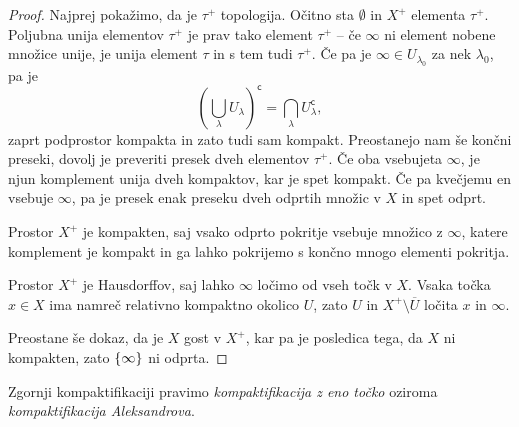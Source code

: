 \begin{proof}
Najprej pokažimo, da je $\tau^+$ topologija. Očitno sta $\emptyset$
in $X^+$ elementa $\tau^+$. Poljubna unija elementov $\tau^+$ je
prav tako element $\tau^+$ -- če $\infty$ ni element nobene množice
unije, je unija element $\tau$ in s tem tudi $\tau^+$. Če pa je
$\infty \in U_{\lambda_0}$ za nek $\lambda_0$, pa je
\[
\left(\bigcup_\lambda U_\lambda\right)^{\mathsf{c}} =
\bigcap_\lambda U_\lambda^{\mathsf{c}},
\]
zaprt podprostor kompakta in zato tudi sam kompakt. Preostanejo nam
še končni preseki, dovolj je preveriti presek dveh elementov
$\tau^+$. Če oba vsebujeta $\infty$, je njun komplement unija dveh
kompaktov, kar je spet kompakt. Če pa kvečjemu en vsebuje $\infty$, 
pa je presek enak preseku dveh odprtih množic v $X$ in spet odprt.

Prostor $X^+$ je kompakten, saj vsako odprto pokritje vsebuje
množico z $\infty$, katere komplement je kompakt in ga lahko
pokrijemo s končno mnogo elementi pokritja.

Prostor $X^+$ je Hausdorffov, saj lahko $\infty$ ločimo od vseh
točk v $X$. Vsaka točka $x \in X$ ima namreč relativno kompaktno
okolico $U$, zato $U$ in $X^+ \setminus \overline{U}$ ločita $x$ in
$\infty$.

Preostane še dokaz, da je $X$ gost v $X^+$, kar pa je posledica
tega, da $X$ ni kompakten, zato $\left\{\infty\right\}$ ni odprta.
\end{proof}

\begin{definicija}
Zgornji kompaktifikaciji pravimo \emph{kompaktifikacija z eno
točko} oziroma
\emph{kompaktifikacija Aleksandrova}.
\end{definicija}
